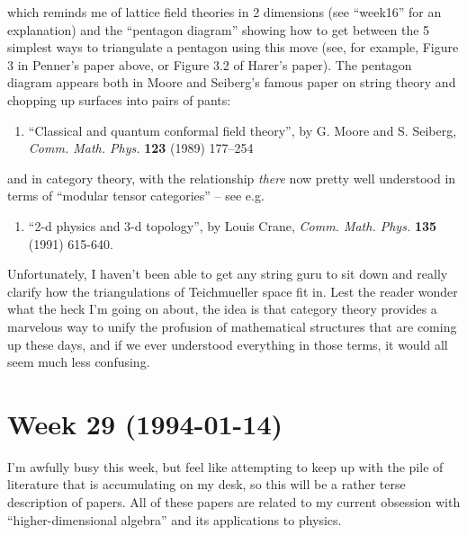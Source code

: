 \documentclass{article}
\def\tightlist{}
\begin{document}
which reminds me of lattice field theories in 2 dimensions (see
``week16'' for an explanation) and the ``pentagon diagram'' showing how
to get between the 5 simplest ways to triangulate a pentagon using this
move (see, for example, Figure 3 in Penner's paper above, or Figure 3.2
of Harer's paper). The pentagon diagram appears both in Moore and
Seiberg's famous paper on string theory and chopping up surfaces into
pairs of pants:

\begin{enumerate}
\def\labelenumi{\arabic{enumi})}
\setcounter{enumi}{7}
\tightlist
\item
  ``Classical and quantum conformal field theory'', by G. Moore and S.
  Seiberg, \emph{Comm. Math. Phys.} \textbf{123} (1989) 177--254
\end{enumerate}

and in category theory, with the relationship \emph{there} now pretty
well understood in terms of ``modular tensor categories'' -- see e.g.

\begin{enumerate}
\def\labelenumi{\arabic{enumi})}
\setcounter{enumi}{8}
\tightlist
\item
  ``2-d physics and 3-d topology'', by Louis Crane, \emph{Comm. Math.
  Phys.} \textbf{135} (1991) 615-640.
\end{enumerate}

Unfortunately, I haven't been able to get any string guru to sit down
and really clarify how the triangulations of Teichmueller space fit in.
Lest the reader wonder what the heck I'm going on about, the idea is
that category theory provides a marvelous way to unify the profusion of
mathematical structures that are coming up these days, and if we ever
understood everything in those terms, it would all seem much less
confusing.
\hypertarget{week-29-1994-01-14}{%
\section{Week 29 (1994-01-14)}\label{week-29-1994-01-14}}

I'm awfully busy this week, but feel like attempting to keep up with the
pile of literature that is accumulating on my desk, so this will be a
rather terse description of papers. All of these papers are related to
my current obsession with ``higher-dimensional algebra'' and its
applications to physics.
\end{document}
